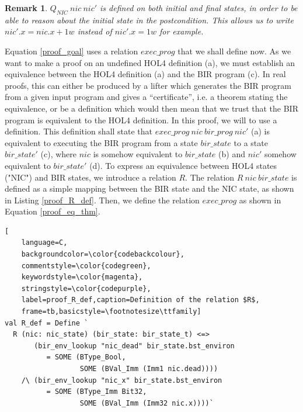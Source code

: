 \documentclass{kththesis}
\newtheorem{remark}{Remark}
\begin{document}
\begin{remark} \label{remark_Q_nic_intial_final}
$Q_{NIC}~nic~nic'$ is defined on both initial and final states, in order to be able to reason about the initial state in the postcondition. This allows us to write $nic'.x = nic.x + 1w$ instead of $nic'.x = 1w$ for example.
\end{remark}

Equation \ref{proof_goal} uses a relation $exec\_prog$ that we shall define now. As we want to make a proof on an undefined HOL4 definition (a), we must establish an equivalence between the HOL4 definition (a) and the BIR program (c). In real proofs, this can either be produced by a lifter which generates the BIR program from a given input program and gives a ``certificate'', i.e. a theorem stating the equivalence, or be a definition which would then mean that we trust that the BIR program is equivalent to the HOL4 definition. In this proof, we will to use a definition. This definition shall state that $exec\_prog~nic~bir\_prog~nic'$ (a) is equivalent to executing the BIR program from a state $bir\_state$ to a state $bir\_state'$ (c), where $nic$ is somehow equivalent to $bir\_state$ (b) and $nic'$ somehow equivalent to $bir\_state'$ (d). To express an equivalence between HOL4 states ("NIC") and BIR states, we introduce a relation $R$. The relation $R~nic~bir\_state$ is defined as a simple mapping between the BIR state and the NIC state, as shown in Listing \ref{proof_R_def}. Then, we define the relation $exec\_prog$ as shown in Equation \ref{proof_eq_thm}\footnotemark.


\begin{lstlisting}[
    language=C,
    backgroundcolor=\color{codebackcolour},
    commentstyle=\color{codegreen},
    keywordstyle=\color{magenta},
    stringstyle=\color{codepurple},
    label=proof_R_def,caption=Definition of the relation $R$,
    frame=tb,basicstyle=\footnotesize\ttfamily]
val R_def = Define `
  R (nic: nic_state) (bir_state: bir_state_t) <=>
       (bir_env_lookup "nic_dead" bir_state.bst_environ
          = SOME (BType_Bool,
                  SOME (BVal_Imm (Imm1 nic.dead))))
    /\ (bir_env_lookup "nic_x" bir_state.bst_environ
          = SOME (BType_Imm Bit32,
                  SOME (BVal_Imm (Imm32 nic.x))))`
\end{lstlisting}
\end{document}
